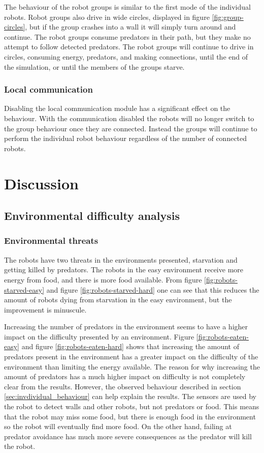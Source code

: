 The behaviour of the robot groups is similar to the first mode of the individual robots.
Robot groups also drive in wide circles, displayed in figure \ref{fig:group-circles}, but if the group crashes into a wall it will simply turn around and continue.
The robot groups consume predators in their path, but they make no attempt to follow detected predators.
The robot groups will continue to drive in circles, consuming energy, predators, and making connections, until the end of the simulation, or until the members of the groups starve.

\subsubsection{Local communication}
\label{sec:disable-local-communication}
Disabling the local communication module has a significant effect on the behaviour.
With the communication disabled the robots will no longer switch to the group behaviour once they are connected.
Instead the groups will continue to perform the individual robot behaviour regardless of the number of connected robots.

\section{Discussion}

\subsection{Environmental difficulty analysis}
\subsubsection{Environmental threats}
The robots have two threats in the environments presented, starvation and getting killed by predators.
The robots in the easy environment receive more energy from food, and there is more food available.
From figure \ref{fig:robots-starved-easy} and figure \ref{fig:robots-starved-hard} one can see that this reduces the amount of robots dying from starvation in the easy environment, but the improvement is minuscule.

Increasing the number of predators in the environment seems to have a higher impact on the difficulty presented by an environment.
Figure \ref{fig:robots-eaten-easy} and figure \ref{fig:robots-eaten-hard} shows that increasing the amount of predators present in the environment has a greater impact on the difficulty of the environment than limiting the energy available.
The reason for why increasing the amount of predators has a much higher impact on difficulty is not completely clear from the results.
However, the observed behaviour described in section \ref{sec:invdividual_behaviour} can help explain the results.
The sensors are used by the robot to detect walls and other robots, but not predators or food.
This means that the robot may miss some food, but there is enough food in the environment so the robot will eventually find more food.
On the other hand, failing at predator avoidance has much more severe consequences as the predator will kill the robot.

